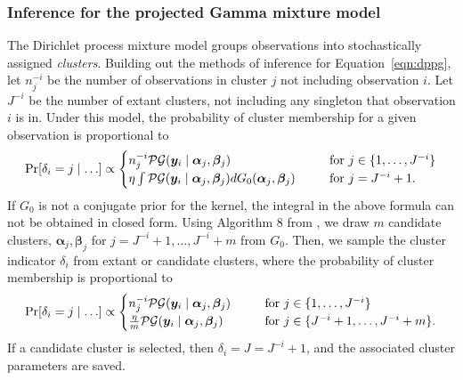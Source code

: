 \subsubsection{Inference for the projected Gamma mixture model}
The Dirichlet process mixture model groups observations into stochastically assigned \emph{clusters}.  Building out the methods of inference for Equation~\ref{eqn:dppg}, let $n_j^{-i}$ be the number of observations in cluster $j$ not including observation $i$.  Let $J^{-i}$ be the number of extant 
clusters, not including any singleton that observation $i$ is in. Under this model, the probability of cluster membership for a given observation is proportional to
\begin{equation*}
    \text{Pr}\left[\delta_i = j\mid\ldots\right] \propto \begin{cases}
        n_j^{-i}\mathcal{PG}\left(\bm{y}_i\mid\bm{\alpha}_j,\bm{\beta}_j\right)\hspace{0.5cm} &\text{~for~}j \in \lbrace 1,\ldots,J^{-i}\rbrace\\
        \eta\int\mathcal{PG}\left(\bm{y}_i\mid\bm{\alpha}_j,\bm{\beta}_j\right)dG_0(\bm{\alpha}_j,\bm{\beta}_j)\hspace{0.5cm} &\text{~for~}j = J^{-i} + 1.
        \end{cases}
\end{equation*}
If $G_0$ is not a conjugate prior for the kernel, the integral in the above formula can not be obtained in closed form. Using Algorithm 8 from \cite{neal2000}, we draw $m$ candidate clusters, $\bm{\alpha}_j,\bm{\beta}_j$ for $j = J^{-i} + 1,\ldots, J^{-i} + m$ from $G_0$. Then, we sample the cluster indicator $\delta_i$ from extant or candidate clusters, where the probability of cluster membership is proportional to
\begin{equation}
    \text{Pr}\left[\delta_i = j\mid\ldots\right] \propto \begin{cases}
        n_j^{-i}\mathcal{PG}\left(\bm{y}_i\mid\bm{\alpha}_j,\bm{\beta}_j\right)\hspace{0.5cm} &\text{~for~}j \in \lbrace 1,\ldots,J^{-i}\rbrace\\
        \frac{\eta}{m}\mathcal{PG}\left(\bm{y}_i\mid\bm{\alpha}_j,\bm{\beta}_j\right)\hspace{0.5cm} &\text{~for~}j \in \lbrace J^{-i} + 1,\ldots, J^{-i} + m\rbrace.
        \end{cases}
\end{equation}
If a candidate cluster is selected,
then $\delta_i = J = J^{- i} + 1$, and the associated cluster parameters are saved.

